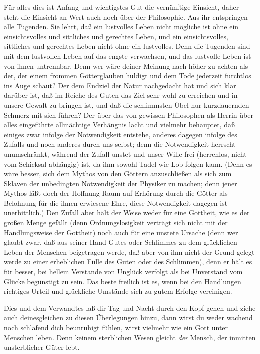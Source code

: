 \documentclass{stex}
\begin{document}
Für alles dies ist Anfang und wichtigstes Gut die vernünftige Einsicht, daher steht die Einsicht an Wert auch noch über der Philosophie.
Aus ihr entspringen alle Tugenden.
Sie lehrt, daß ein lustvolles Leben nicht mögliche ist ohne ein einsichtsvolles und sittliches und gerechtes Leben, und ein einsichtsvolles, sittliches und gerechtes Leben nicht ohne ein lustvolles.
Denn die Tugenden sind mit dem lustvollen Leben auf das engste verwachsen, und das lustvolle Leben ist von ihnen untrennbar.
Denn wer wäre deiner Meinung nach höher zu achten als der, der einem frommen Götterglauben huldigt und dem Tode jederzeit furchtlos ins Auge schaut?
Der dem Endziel der Natur nachgedacht hat und sich klar darüber ist, daß im Reiche des Guten das Ziel sehr wohl zu erreichen und in unsere Gewalt zu bringen ist, und daß die schlimmsten Übel nur kurzdauernden Schmerz mit sich führen?
Der über das von gewissen Philosophen als Herrin über alles eingeführte allmächtige Verhängnis lacht und vielmehr behauptet, daß einiges zwar infolge der Notwendigkeit entstehe, anderes dagegen infolge des Zufalls und noch anderes durch uns selbst; denn die Notwendigkeit herrscht unumschränkt, während der Zufall unstet und unser Wille frei (herrenlos, \dasIst nicht vom Schicksal abhängig) ist, da ihm sowohl Tadel wie Lob folgen kann.
(Denn es wäre besser, sich dem Mythos von den Göttern anzuschließen als sich zum Sklaven der unbedingten Notwendigkeit der Physiker zu machen; denn jener Mythos läßt doch der Hoffnung Raum auf Erhörung durch die Götter als Belohnung für die ihnen erwiesene Ehre, diese Notwendigkeit dagegen ist unerbittlich.)
Den Zufall aber hält der Weise weder für eine Gottheit, wie es der großen Menge gefällt (denn Ordnungslosigkeit verträgt sich nicht mit der Handlungsweise der Gottheit) noch auch für eine unstete Ursache (denn wer glaubt zwar, daß aus seiner Hand Gutes oder Schlimmes zu dem glücklichen Leben der Menschen beigetragen werde, daß aber von ihm nicht der Grund gelegt werde zu einer erheblichen Fülle des Guten oder des Schlimmen), denn er hält es für besser, bei hellem Verstande von Unglück verfolgt als bei Unverstand vom Glücke begünstigt zu sein.
Das beste freilich ist es, wenn bei den Handlungen richtiges Urteil und glückliche Umstände sich zu gutem Erfolge vereinigen.

Dies und dem Verwandtes laß dir Tag und Nacht durch den Kopf gehen und ziehe auch deinesgleichen zu diesen Überlegungen hinzu, dann wirst du weder wachend noch schlafend dich beunruhigt fühlen, wirst vielmehr wie ein Gott unter Menschen leben.
Denn keinem sterblichen Wesen gleicht \emph{der} Mensch, der inmitten unsterblicher Güter lebt.
\end{document}
